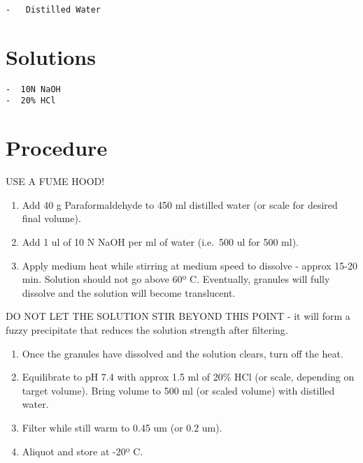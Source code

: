 \documentclass[
  letterpaper,
  DIV=11,
  numbers=noendperiod]{scrreprt}
\providecommand{\tightlist}{%
  \setlength{\itemsep}{0pt}\setlength{\parskip}{0pt}}\usepackage{longtable,booktabs,array}
\begin{document}
\begin{verbatim}
-   Distilled Water
\end{verbatim}

\hypertarget{solutions-61}{%
\section{Solutions}\label{solutions-61}}

\begin{verbatim}
-  10N NaOH
-  20% HCl
\end{verbatim}

\hypertarget{procedure-66}{%
\section{Procedure}\label{procedure-66}}

USE A FUME HOOD!

\begin{enumerate}
\def\labelenumi{\arabic{enumi}.}
\tightlist
\item
  Add 40 g Paraformaldehyde to 450 ml distilled water (or scale for
  desired final volume).
\item
  Add 1 ul of 10 N NaOH per ml of water (i.e.~500 ul for 500 ml).
\item
  Apply medium heat while stirring at medium speed to dissolve - approx
  15-20 min. Solution should not go above 60º C. Eventually, granules
  will fully dissolve and the solution will become translucent.
\end{enumerate}

DO NOT LET THE SOLUTION STIR BEYOND THIS POINT - it will form a fuzzy
precipitate that reduces the solution strength after filtering.

\begin{enumerate}
\def\labelenumi{\arabic{enumi}.}
\setcounter{enumi}{3}
\tightlist
\item
  Once the granules have dissolved and the solution clears, turn off the
  heat.
\item
  Equilibrate to pH 7.4 with approx 1.5 ml of 20\% HCl (or scale,
  depending on target volume). Bring volume to 500 ml (or scaled volume)
  with distilled water.\\
\item
  Filter while still warm to 0.45 um (or 0.2 um).\\
\item
  Aliquot and store at -20º C.
\end{enumerate}
\end{document}
